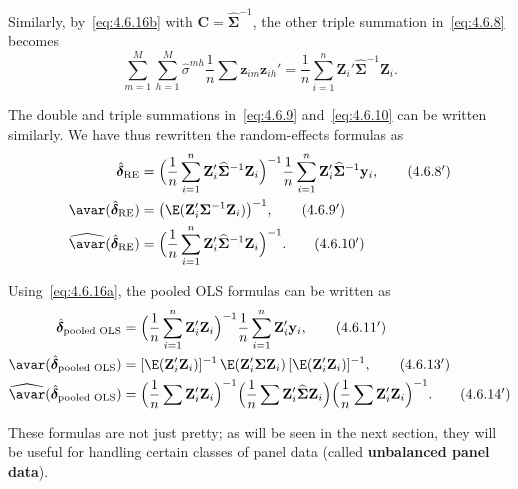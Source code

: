Similarly, by~\eqref{eq:4.6.16b} with
$\mathbf{C} = \widehat{\boldsymbol{\Sigma}}^{-1}$, the other triple summation
in~\eqref{eq:4.6.8} becomes
\begin{equation}
\sum_{m=1}^{M} \sum_{h=1}^{M} \hat{\sigma}^{mh}
\frac{1}{n} \sum \mathbf{z}_{im} \mathbf{z}_{ih}'
= \frac{1}{n} \sum_{i=1}^{n} \mathbf{Z}_i'
\widehat{\boldsymbol{\Sigma}}^{-1} \mathbf{Z}_i.
\label{eq:4.6.18}
\end{equation}

The double and triple summations in~\eqref{eq:4.6.9} and~\eqref{eq:4.6.10}
can be written similarly. We have thus rewritten the random-effects formulas as
\begin{align}
\hat{\boldsymbol{\delta}}_{\mathrm{RE}}
&= \Bigl(\frac{1}{n} \sum_{i=1}^{n} \mathbf{Z}_i'
\widehat{\boldsymbol{\Sigma}}^{-1} \mathbf{Z}_i\Bigr)^{-1}
\frac{1}{n} \sum_{i=1}^{n} \mathbf{Z}_i'
\widehat{\boldsymbol{\Sigma}}^{-1} \mathbf{y}_i,
\tag{4.6.8$'$} \label{eq:4.6.8p} \\
\avar(\hat{\boldsymbol{\delta}}_{\mathrm{RE}})
&= \bigl(\E(\mathbf{Z}_i' \boldsymbol{\Sigma}^{-1} \mathbf{Z}_i)\bigr)^{-1},
\tag{4.6.9$'$} \label{eq:4.6.9p} \\
\widehat{\avar}(\hat{\boldsymbol{\delta}}_{\mathrm{RE}})
&= \Bigl(\frac{1}{n} \sum_{i=1}^{n} \mathbf{Z}_i'
\widehat{\boldsymbol{\Sigma}}^{-1} \mathbf{Z}_i\Bigr)^{-1}.
\tag{4.6.10$'$} \label{eq:4.6.10p}
\end{align}

Using~\eqref{eq:4.6.16a}, the pooled OLS formulas can be written as
\begin{align}
\hat{\boldsymbol{\delta}}_{\text{pooled OLS}}
&= \Bigl(\frac{1}{n} \sum_{i=1}^{n} \mathbf{Z}_i' \mathbf{Z}_i\Bigr)^{-1}
\frac{1}{n} \sum_{i=1}^{n} \mathbf{Z}_i' \mathbf{y}_i,
\tag{4.6.11$'$} \label{eq:4.6.11p} \\
\avar(\hat{\boldsymbol{\delta}}_{\text{pooled OLS}})
&= [\E(\mathbf{Z}_i' \mathbf{Z}_i)]^{-1}\,
\E(\mathbf{Z}_i' \boldsymbol{\Sigma} \mathbf{Z}_i)\,
[\E(\mathbf{Z}_i' \mathbf{Z}_i)]^{-1},
\tag{4.6.13$'$} \label{eq:4.6.13p} \\
\widehat{\avar}(\hat{\boldsymbol{\delta}}_{\text{pooled OLS}})
&= \Bigl(\frac{1}{n} \sum \mathbf{Z}_i' \mathbf{Z}_i\Bigr)^{-1}
\Bigl(\frac{1}{n} \sum \mathbf{Z}_i'
\widehat{\boldsymbol{\Sigma}} \mathbf{Z}_i\Bigr)
\Bigl(\frac{1}{n} \sum \mathbf{Z}_i' \mathbf{Z}_i\Bigr)^{-1}.
\tag{4.6.14$'$} \label{eq:4.6.14p}
\end{align}

These formulas are not just pretty; as will be seen in the next section, they will be
useful for handling certain classes of panel data (called \textbf{unbalanced panel data}).

